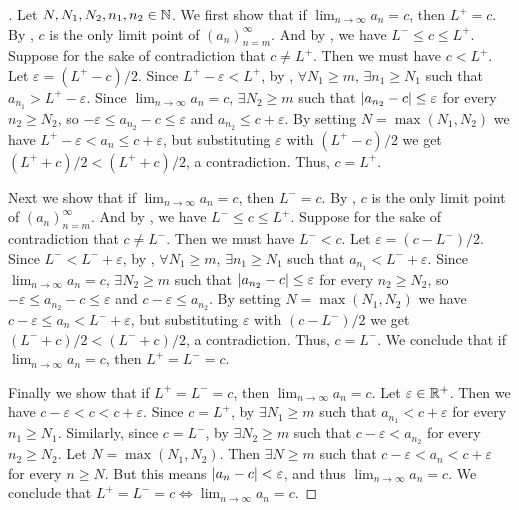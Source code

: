 \begin{proof}[]
  Let \(N, N_1, N_2, n_1, n_2 \in \mathbb{N}\).
  We first show that if \(\lim_{n \to \infty} a_n = c\), then \(L^+ = c\).
  By , \(c\) is the only limit point of \((a_n)_{n = m}^\infty\).
  And by , we have \(L^- \leq c \leq L^+\).
  Suppose for the sake of contradiction that \(c \neq L^+\).
  Then we must have \(c < L^+\).
  Let \(\varepsilon = (L^+ - c) / 2\).
  Since \(L^+ - \varepsilon < L^+\), by , \(\forall N_1 \geq m\), \(\exists n_1 \geq N_1\) such that \(a_{n_1} > L^+ - \varepsilon\).
  Since \(\lim_{n \to \infty} a_n = c\), \(\exists N_2 \geq m\) such that \(\left\lvert a_{n_2} - c\right\rvert \leq \varepsilon\) for every \(n_2 \geq N_2\), so \(-\varepsilon \leq a_{n_2} - c \leq \varepsilon\) and \(a_{n_2} \leq c + \varepsilon\).
  By setting \(N = \max(N_1, N_2)\) we have \(L^+ - \varepsilon < a_n \leq c + \varepsilon\), but substituting \(\varepsilon\) with \((L^+ - c) / 2\) we get \((L^+ + c) / 2 < (L^+ + c) / 2\), a contradiction.
  Thus, \(c = L^+\).

  Next we show that if \(\lim_{n \to \infty} a_n = c\), then \(L^- = c\).
  By , \(c\) is the only limit point of \((a_n)_{n = m}^\infty\).
  And by , we have \(L^- \leq c \leq L^+\).
  Suppose for the sake of contradiction that \(c \neq L^-\).
  Then we must have \(L^- < c\).
  Let \(\varepsilon = (c - L^-) / 2\).
  Since \(L^- < L^- + \varepsilon\), by , \(\forall N_1 \geq m\), \(\exists n_1 \geq N_1\) such that \(a_{n_1} < L^- + \varepsilon\).
  Since \(\lim_{n \to \infty} a_n = c\), \(\exists N_2 \geq m\) such that \(\left\lvert a_{n_2} - c\right\rvert \leq \varepsilon\) for every \(n_2 \geq N_2\), so \(-\varepsilon \leq a_{n_2} - c \leq \varepsilon\) and \(c - \varepsilon \leq a_{n_2}\).
  By setting \(N = \max(N_1, N_2)\) we have \(c - \varepsilon \leq a_n < L^- + \varepsilon\), but substituting \(\varepsilon\) with \((c - L^-) / 2\) we get \((L^- + c) / 2 < (L^- + c) / 2\), a contradiction.
  Thus, \(c = L^-\).
  We conclude that if \(\lim_{n \to \infty} a_n = c\), then \(L^+ = L^- = c\).

  Finally we show that if \(L^+ = L^- = c\), then \(\lim_{n \to \infty} a_n = c\).
  Let \(\varepsilon \in \mathbb{R}^+\).
  Then we have \(c - \varepsilon < c < c + \varepsilon\).
  Since \(c = L^+\), by  \(\exists N_1 \geq m\) such that \(a_{n_1} < c + \varepsilon\) for every \(n_1 \geq N_1\).
  Similarly, since \(c = L^-\), by  \(\exists N_2 \geq m\) such that \(c - \varepsilon < a_{n_2}\) for every \(n_2 \geq N_2\).
  Let \(N = \max(N_1, N_2)\).
  Then \(\exists N \geq m\) such that \(c - \varepsilon < a_n < c + \varepsilon\) for every \(n \geq N\).
  But this means \(\left\lvert a_n - c\right\rvert < \varepsilon\), and thus \(\lim_{n \to \infty} a_n = c\).
  We conclude that \(L^+ = L^- = c \iff \lim_{n \to \infty} a_n = c\).
\end{proof}

